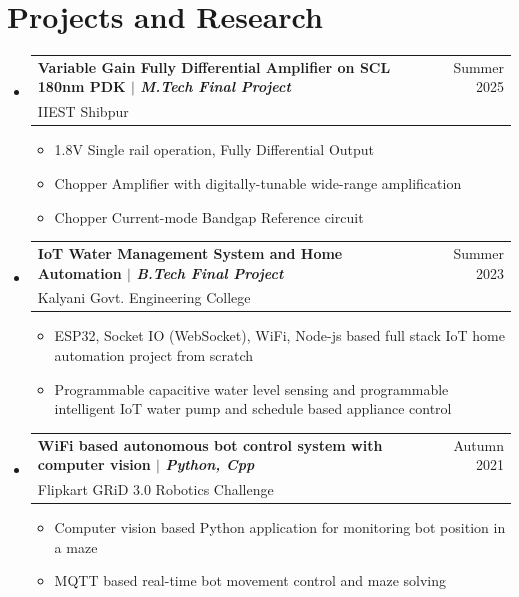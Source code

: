 \documentclass[11pt]{article}
\makeatletter
\newcommand{\CVItem}[1]{
  \item\small{
    {#1 \vspace{-2pt}}
  }
}
\newcommand{\CVSubheading}[4]{
  \vspace{-2pt}\item
    \begin{tabular*}{0.97\textwidth}[t]{l@{\extracolsep{\fill}}r}
      \textbf{#1} & #2 \\
      \small#3 & \small #4 \\
    \end{tabular*}\vspace{-7pt}
}
\newcommand{\CVSubHeadingListStart}{\begin{itemize}[leftmargin=0.5cm, label={}]}
\newcommand{\CVSubHeadingListEnd}{\end{itemize}}
\newcommand{\CVItemListStart}{\begin{itemize}}
\newcommand{\CVItemListEnd}{\end{itemize}\vspace{-5pt}}
\makeatother
\begin{document}
\section{Projects and Research}
  \CVSubHeadingListStart

    \CVSubheading
      {{Variable Gain Fully Differential Amplifier on SCL 180nm PDK} $|$ \emph{\small{M.Tech Final Project}}}{Summer 2025}
      {IIEST Shibpur}{}
    \CVItemListStart
      \CVItem{1.8V Single rail operation, Fully Differential Output}
      \CVItem{Chopper Amplifier with digitally-tunable wide-range amplification}
      \CVItem{Chopper Current-mode Bandgap Reference circuit}
    \CVItemListEnd 
    
    \CVSubheading
      {{IoT Water Management System and Home Automation} $|$ \emph{\small{B.Tech Final Project}}}{Summer 2023}
      {Kalyani Govt. Engineering College}{}
    \CVItemListStart
        \CVItem{ESP32, Socket IO (WebSocket), WiFi, Node-js based full stack IoT home automation project from scratch}
        \CVItem{Programmable capacitive water level sensing and programmable intelligent IoT water pump and schedule based appliance control}
    \CVItemListEnd      
      
    \CVSubheading
      {{WiFi based autonomous bot control system with computer vision} $|$ \emph{\small{Python, Cpp}}}{Autumn 2021}
      {Flipkart GRiD 3.0 Robotics Challenge}{}
    \CVItemListStart
        \CVItem{Computer vision based Python application for monitoring bot position in a maze}
        \CVItem{MQTT based real-time bot movement control and maze solving}
    \CVItemListEnd 
    
  \CVSubHeadingListEnd


\end{document}

